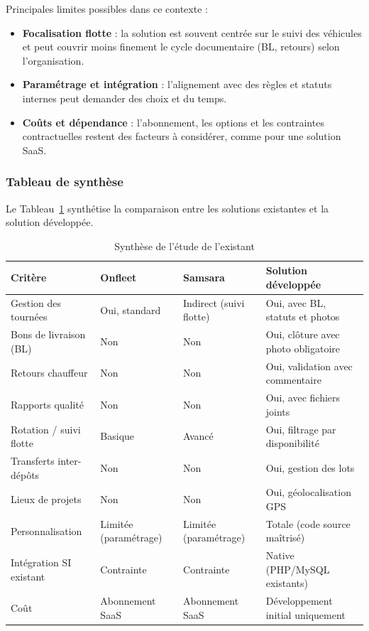 \documentclass[12pt,a4paper]{article}
\begin{document}
    Principales limites possibles dans ce contexte :
    \begin{itemize}[leftmargin=1.2em]
    \item \textbf{Focalisation flotte} : la solution est souvent centrée sur le suivi des véhicules et peut couvrir moins finement le cycle documentaire (BL, retours) selon l'organisation.
    \item \textbf{Paramétrage et intégration} : l'alignement avec des règles et statuts internes peut demander des choix et du temps.
    \item \textbf{Coûts et dépendance} : l'abonnement, les options et les contraintes contractuelles restent des facteurs à considérer, comme pour une solution SaaS.
    \end{itemize}

    \subsubsection{Tableau de synthèse}

    Le Tableau~\ref{tab:synthese-existant} synthétise la comparaison entre les solutions existantes et la solution développée.

    \begin{table}[ht]
    \centering
    \renewcommand{\arraystretch}{1.4}
    \caption{Synthèse de l'étude de l'existant}
    \label{tab:synthese-existant}
    \begin{tabular}{|p{3cm}|p{4.5cm}|p{4.5cm}|p{4.5cm}|}
    \hline
    \textbf{Critère} & \textbf{Onfleet} & \textbf{Samsara} & \textbf{Solution développée} \\
    \hline
    Gestion des tournées & Oui, standard & Indirect (suivi flotte) & Oui, avec BL, statuts et photos \\
    \hline
    Bons de livraison (BL) & Non & Non & Oui, clôture avec photo obligatoire \\
    \hline
    Retours chauffeur & Non & Non & Oui, validation avec commentaire \\
    \hline
    Rapports qualité & Non & Non & Oui, avec fichiers joints \\
    \hline
    Rotation / suivi flotte & Basique & Avancé & Oui, filtrage par disponibilité \\
    \hline
    Transferts inter-dépôts & Non & Non & Oui, gestion des lots \\
    \hline
    Lieux de projets & Non & Non & Oui, géolocalisation GPS \\
    \hline
    Personnalisation & Limitée (paramétrage) & Limitée (paramétrage) & Totale (code source maîtrisé) \\
    \hline
    Intégration SI existant & Contrainte & Contrainte & Native (PHP/MySQL existants) \\
    \hline
    Coût & Abonnement SaaS & Abonnement SaaS & Développement initial uniquement \\
    \hline
    \end{tabular}
    \end{table}
\end{document}
